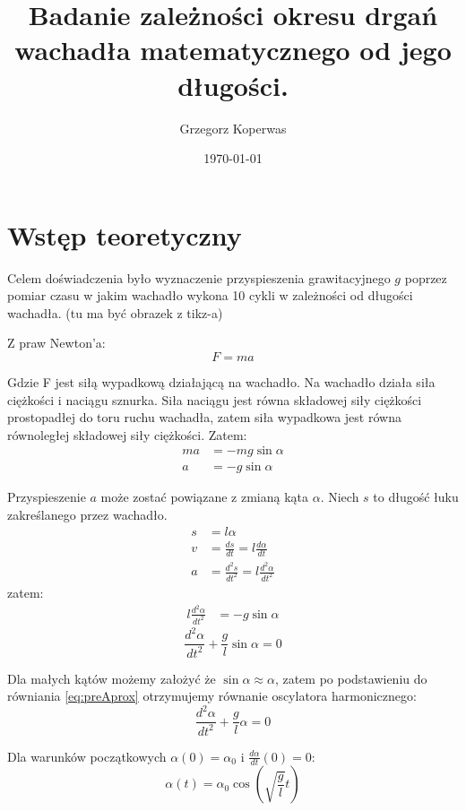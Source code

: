 \documentclass[a4paper,12pt]{article}
\title{Badanie zależności okresu drgań wachadła matematycznego od jego długości.}
\author{Grzegorz Koperwas}
\date{\today{}}
\begin{document}
\begin{titlepage}
		\maketitle
\end{titlepage}


\section{Wstęp teoretyczny}

Celem doświadczenia było wyznaczenie przyspieszenia grawitacyjnego $g$ poprzez pomiar czasu w jakim wachadło wykona 10 cykli w zależności od długości wachadła. 
(tu ma być obrazek z tikz-a)

Z praw Newton'a:
\[F = ma\]

Gdzie F jest siłą wypadkową działającą na wachadło. Na wachadło działa siła ciężkości i naciągu sznurka. Siła naciągu jest równa składowej siły ciężkości prostopadłej do toru ruchu wachadła, zatem siła wypadkowa jest równa równoległej składowej siły ciężkości. Zatem:
\begin{align*}
		ma &= -mg\sin \alpha \\
		a &= -g\sin \alpha
\end{align*}

Przyspieszenie $a$ może zostać powiązane z zmianą kąta $\alpha$. Niech $s$ to długość łuku zakreślanego przez wachadło.
\begin{align*}
		s &= l\alpha\\
		v &= \frac{ds}{dt} = l \frac{d\alpha}{dt}\\
		a &= \frac{d^2s}{dt^2} = l \frac{d^2 \alpha}{d t^2}
\end{align*}
zatem:
\begin{align*}
		l \frac{d^2 \alpha}{d t^2} &= -g \sin \alpha
\end{align*}
\begin{equation}
		\frac{d^2 \alpha}{d t^2} + \frac{g}{l}\sin \alpha = 0
		\label{eq:preAprox}
\end{equation}

Dla małych kątów możemy założyć że $\sin \alpha\approx \alpha$, zatem po podstawieniu do równiania \ref{eq:preAprox} otrzymujemy równanie oscylatora harmonicznego:
\[ \frac{d^2 \alpha}{d t^2} + \frac{g}{l} \alpha = 0 \]

Dla warunków początkowych $\alpha \left( 0 \right) = \alpha_0$ i $\frac{d\alpha}{dt}\left( 0 \right) = 0$:
\[ \alpha \left( t \right) = \alpha_0 \cos\left(\sqrt{\frac{g}{l}}t \right) \]
\end{document}
